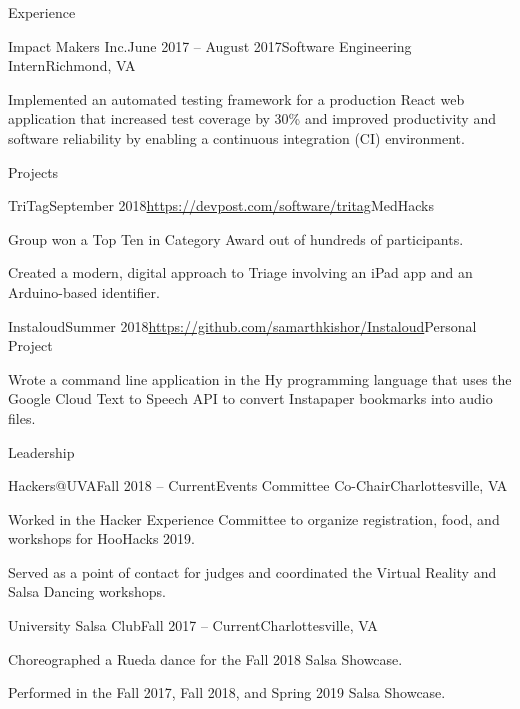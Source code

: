 \documentclass{resume}
\begin{document}
\begin{rSection}{Experience}
  \begin{rSubsection}{Impact Makers Inc.}{June 2017 -- August 2017}{Software Engineering Intern}{Richmond, VA}
    \item Implemented an automated testing framework for a production React web application that increased test coverage by 30\% and improved productivity and software reliability by enabling a continuous integration (CI) environment.
  \end{rSubsection}

\end{rSection}

\begin{rSection}{Projects}

  \begin{rSubsection}{TriTag}{September 2018}{\url{https://devpost.com/software/tritag}}{MedHacks}
    \item Group won a Top Ten in Category Award out of hundreds of participants.
    \item Created a modern, digital approach to Triage involving an iPad app and an Arduino-based identifier.
  \end{rSubsection}

  \begin{rSubsection}{Instaloud}{Summer 2018}{\url{https://github.com/samarthkishor/Instaloud}}{Personal Project}
    \item Wrote a command line application in the Hy programming language that uses the Google Cloud Text to Speech API to convert Instapaper bookmarks into audio files.
  \end{rSubsection}

\end{rSection}

\begin{rSection}{Leadership}

  \begin{rSubsection}{Hackers@UVA}{Fall 2018 -- Current}{Events Committee Co-Chair}{Charlottesville, VA}
    \item Worked in the Hacker Experience Committee to organize registration, food, and workshops for HooHacks 2019.
    \item Served as a point of contact for judges and coordinated the Virtual Reality and Salsa Dancing workshops.
  \end{rSubsection}

  \begin{rSubsection}{University Salsa Club}{Fall 2017 -- Current}{}{Charlottesville, VA}
    \item Choreographed a Rueda dance for the Fall 2018 Salsa Showcase.
    \item Performed in the Fall 2017, Fall 2018, and Spring 2019 Salsa Showcase.
  \end{rSubsection}

\end{rSection}
\end{document}
